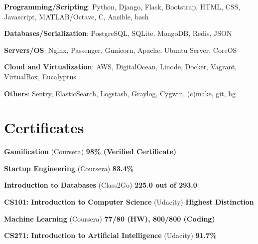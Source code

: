 \documentclass[margin,line]{resume}
\begin{document}
\begin{resume}
    \begin{list2}
	\item \textbf{Programming/Scripting}: \hspace{2mm} Python, Django, Flask, Bootstrap, HTML, CSS, Javascript, MATLAB/Octave, C, Ansible, bash
	\item \textbf{Databases/Serialization}: \hspace{5.7mm} PostgreSQL, SQLite,	MongoDB, Redis, JSON
	\item \textbf{Servers/OS}: \hspace{28mm}  Nginx, Passenger, Gunicorn, Apache, Ubuntu Server, CoreOS
	\item \textbf{Cloud and Virtualization}: \hspace{3mm} AWS, DigitalOcean, Linode, Docker, Vagrant, VirtualBox, Eucalyptus
	\item \textbf{Others}: \hspace{36mm} Sentry, ElasticSearch, Logstash, Graylog, Cygwin, (c)make, git, hg
	\end{list2}

    \section{\mysidestyle Certificates}

    \begin{list2}
    \item \textbf{Gamification} (Coursera) \hspace{74mm} \textbf{98\% (Verified Certificate)}
    
	\item \textbf{Startup Engineering} (Coursera) \hspace{94mm} \textbf{83.4\%}

	\item \textbf{Introduction to Databases} (Class2Go) \hspace{64mm} \textbf{225.0 out of 293.0}

	\item \textbf{CS101: Introduction to Computer Science} (Udacity) \hspace{34mm} \textbf{Highest Distinction}

	\item \textbf{Machine Learning} (Coursera) \hspace{54mm} \textbf{77/80 (HW), 800/800 (Coding)}

	\item \textbf{CS271: Introduction to Artificial Intelligence} (Udacity) \hspace{52mm} \textbf{91.7\%}


\end{list2}
\end{resume}
\end{document}
